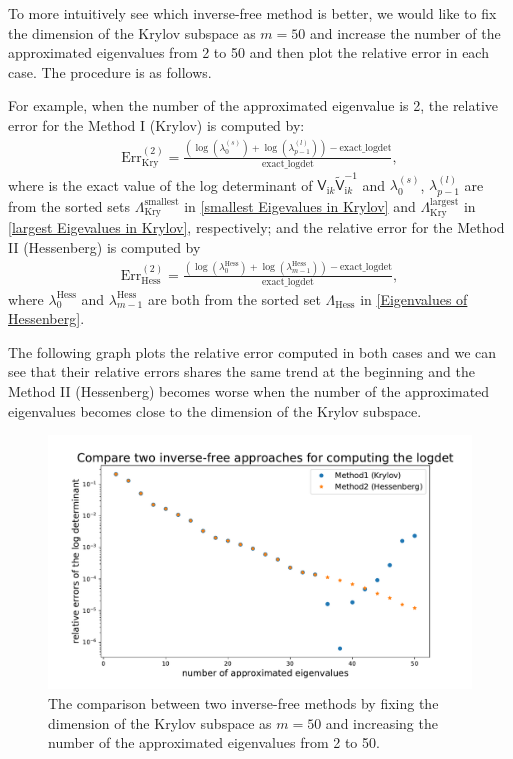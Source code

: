 To more intuitively see which inverse-free method is better, we would like to fix the dimension of the Krylov subspace as $m = 50$ and increase the number of 
the approximated eigenvalues from 2 to 50 and then plot the relative error in each case. The procedure is as follows.

For example, when the number of the approximated eigenvalue is 2, the relative error for the Method I (Krylov) is computed by:
\begin{align*}
    \text{Err}^{(2)}_{\text{Kry}} = \frac{\left(\log(\lambda_{0}^{(s)}) + \log(\lambda_{p-1}^{(l)})\right) - \text{exact\_logdet}}{\text{exact\_logdet}},
\end{align*}
where  is the exact value of the log determinant of $\mathsf{V}_{\mathrm{i}k}\tilde{\mathsf{V}}_{\mathrm{i}k}^{-1}$ and  
$\lambda_{0}^{(s)}$, $\lambda_{p-1}^{(l)}$ are from the sorted sets $\Lambda_{\text{Kry}}^{\text{smallest}}$ in \eqref{smallest Eigevalues in Krylov} and 
$\Lambda_{\text{Kry}}^{\text{largest}}$ in \eqref{largest Eigevalues in Krylov}, respectively;
and the relative error for the Method II (Hessenberg) is computed by
\begin{align*}
    \text{Err}^{(2)}_{\text{Hess}} = \frac{\left(\log(\lambda_{0}^{\text{Hess}}) + \log(\lambda_{m-1}^{\text{Hess}})\right) - \text{exact\_logdet}}{\text{exact\_logdet}},
\end{align*}
where $\lambda_{0}^{\text{Hess}}$ and $\lambda_{m-1}^{\text{Hess}}$ are both from the sorted set $\Lambda_{\text{Hess}}$ in \eqref{Eigenvalues of Hessenberg}.

The following graph plots the relative error computed in both cases and we can see that their relative errors shares the same trend at the beginning and 
the Method II (Hessenberg) becomes worse when the number of the approximated eigenvalues becomes close to the dimension of the Krylov subspace.

\begin{figure}[H]
    \centering
    \includegraphics[scale = 0.5]{figures/compare_two_inv_free_approaches.pdf}
    \caption{The comparison between two inverse-free methods by fixing the dimension of the Krylov subspace as $m = 50$ and increasing the number of the 
    approximated eigenvalues from 2 to 50.}
\end{figure}
